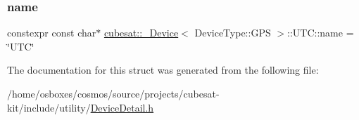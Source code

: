 \subsubsection{\texorpdfstring{name}{name}}
{\footnotesize\ttfamily constexpr const char$\ast$ \hyperlink{structcubesat_1_1__Device}{cubesat\+::\+\_\+\+Device}$<$ Device\+Type\+::\+G\+PS $>$\+::U\+T\+C\+::name = \char`\"{}U\+TC\char`\"{}\hspace{0.3cm}{\ttfamily [static]}}



The documentation for this struct was generated from the following file\+:\begin{DoxyCompactItemize}
\item 
/home/osboxes/cosmos/source/projects/cubesat-\/kit/include/utility/\hyperlink{DeviceDetail_8h}{Device\+Detail.\+h}\end{DoxyCompactItemize}

